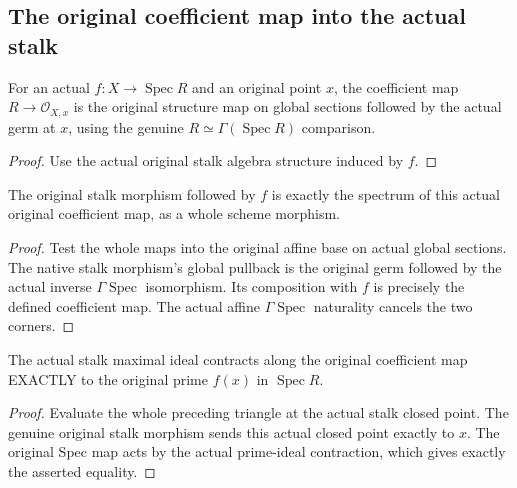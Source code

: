 \subsection{The original coefficient map into the actual stalk}

\begin{definition}
\label{alggeom:original-stalk-coefficient-map}
\leanok
For an actual $f:X\to\operatorname{Spec}R$ and an original point $x$, the
coefficient map $R\to\mathcal O_{X,x}$ is the original structure map on global
sections followed by the actual germ at $x$, using the genuine
$R\simeq\Gamma(\operatorname{Spec}R)$ comparison.
\end{definition}
\begin{proof}
Use the actual original stalk algebra structure induced by $f$.
\end{proof}

\begin{lemma}
\label{alggeom:original-stalk-coefficient-triangle}
\leanok
{}
The original stalk morphism followed by $f$ is exactly the spectrum of this
actual original coefficient map, as a whole scheme morphism.
\end{lemma}
\begin{proof}
Test the whole maps into the original affine base on actual global sections.
The native stalk morphism's global pullback is the original germ followed by
the actual inverse $\Gamma\operatorname{Spec}$ isomorphism. Its composition
with $f$ is precisely the defined coefficient map. The actual affine
$\Gamma\operatorname{Spec}$ naturality cancels the two corners.
\end{proof}

\begin{lemma}
\label{alggeom:original-stalk-coefficient-center}
\leanok
{}
The actual stalk maximal ideal contracts along the original coefficient map
EXACTLY to the original prime $f(x)$ in $\operatorname{Spec}R$.
\end{lemma}
\begin{proof}
Evaluate the whole preceding triangle at the actual stalk closed point.
The genuine original stalk morphism sends this actual closed point exactly
to $x$. The original Spec map acts by the actual prime-ideal contraction,
which gives exactly the asserted equality.
\end{proof}

